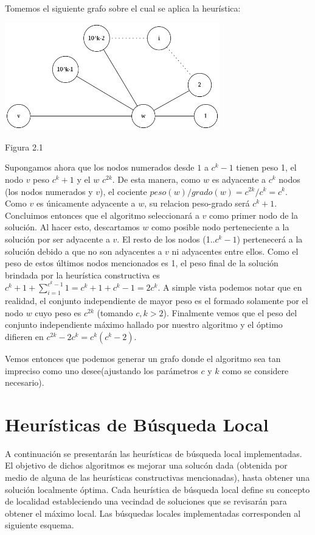 \documentclass[a4paper,11pt] {article}
\begin{document}
Tomemos el siguiente grafo sobre el cual se aplica la heur\'istica:

\begin{center}
\includegraphics[width=0.7\textwidth]{graficos/casoMaloHC.png}
\begin{center}
Figura 2.1
\end{center}
\end{center}

Supongamos ahora que los nodos numerados desde $1$ a $c^{k}-1$ tienen peso 1, el nodo $v$ peso $c^{k}+1$ y el $w$ $c^{2k}$. De esta manera, como $w$ es adyacente a $c^{k}$ nodos (los nodos numerados y $v$), el cociente $peso(w)/grado(w)=c^{2k}/c^{k}=c^{k}$. Como $v$ es \'unicamente adyacente a $w$, su relacion peso-grado ser\'a $c^{k}+1$. Concluimos entonces que el algoritmo seleccionar\'a a $v$ como primer nodo de la soluci\'on. Al hacer esto, descartamos $w$ como posible nodo perteneciente a la soluci\'on por ser adyacente a $v$. El resto de los nodos (1..$c^{k}-1$) pertenecer\'a a la soluci\'on debido a que no son adyacentes a $v$ ni adyacentes entre ellos. Como el peso de estos \'ultimos nodos mencionados es 1, el peso final de la soluci\'on brindada por la heur\'istica constructiva es $c^{k}+1+\sum_{i=1}^{c^{k}-1}1=c^{k}+1+c^{k}-1=2c^{k}$. A simple vista podemos notar que en realidad, el conjunto independiente de mayor peso es el formado solamente por el nodo $w$ cuyo peso es $c^{2k}$ (tomando $c,k>2$). Finalmente vemos que el peso del conjunto independiente m\'aximo hallado por nuestro algoritmo y el \'optimo difieren en $c^{2k}-2c^{k}=c^{k}(c^{k}-2)$.

Vemos entonces que podemos generar un grafo donde el algoritmo sea tan impreciso como uno desee(ajustando los par\'ametros $c$ y $k$ como se considere necesario).

\bigskip
\section{Heur\'isticas de B\'usqueda Local}

A continuaci\'on se presentar\'an las heur\'isticas de b\'usqueda local implementadas. El objetivo de dichos algoritmos es mejorar una soluc\'on dada (obtenida por medio de alguna de las heur\'isticas constructivas mencionadas), hasta obtener una soluci\'on localmente \'optima. Cada heur\'istica de b\'usqueda local define su concepto de localidad estableciendo una vecindad de soluciones que se revisar\'an para obtener el m\'aximo local. Las b\'usquedas locales implementadas corresponden al siguiente esquema.
\end{document}
